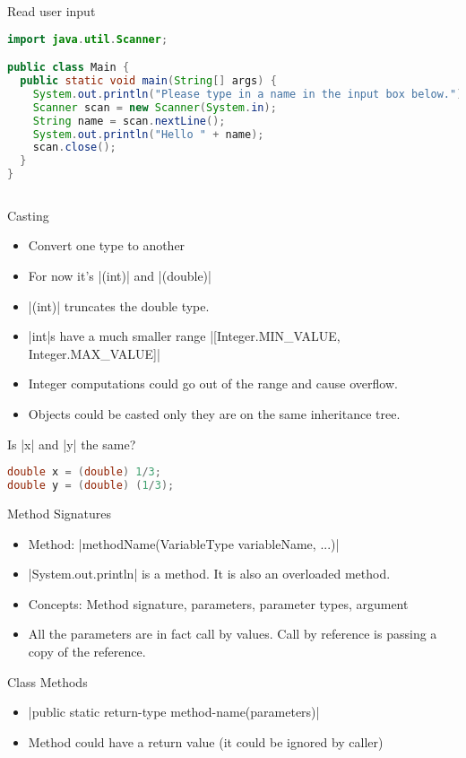 \documentclass[aspectratio=169]{beamer}
\renewcommand{\verb}{\collectverb{\color{codegreen}}}
\begin{document}
\begin{frame}[fragile]{Read user input}
    \begin{lstlisting}[language=Java]
import java.util.Scanner;

public class Main {
  public static void main(String[] args) {
    System.out.println("Please type in a name in the input box below.");
    Scanner scan = new Scanner(System.in);
    String name = scan.nextLine();
    System.out.println("Hello " + name);
    scan.close();
  }
}
        
    \end{lstlisting}
\end{frame}

\begin{frame}[fragile]{Casting}
    \begin{itemize}
        \item Convert one type to another
        \item For now it's \verb|(int)| and \verb|(double)|
        \item \verb|(int)| truncates the double type.
        \item \verb|int|s have a much smaller range \verb|[Integer.MIN_VALUE, Integer.MAX_VALUE]|
        \item Integer computations could go out of the range and cause overflow.
        \item Objects could be casted only they are on the same inheritance tree.
    \end{itemize}
    Is \verb|x| and \verb|y| the same?
    \begin{lstlisting}[language=Java]
double x = (double) 1/3;
double y = (double) (1/3);
    \end{lstlisting}
\end{frame}


\begin{frame}[fragile]{Method Signatures}
    \begin{itemize}
        \item Method: \verb|methodName(VariableType variableName, ...)|
        \item \verb|System.out.println| is a method. It is also an \alert{overloaded} method.
        \item Concepts: Method signature, parameters, parameter types, argument        
        \item All the parameters are in fact call by \alert{values}. Call by reference is passing a copy of the reference.        
    \end{itemize}
\end{frame}

\begin{frame}[fragile]{Class Methods}
    \begin{itemize}
        \item \verb|public static return-type method-name(parameters)|
        \item Method could have a return value (it could be ignored by caller)
    \end{itemize}
\end{frame}
\end{document}
